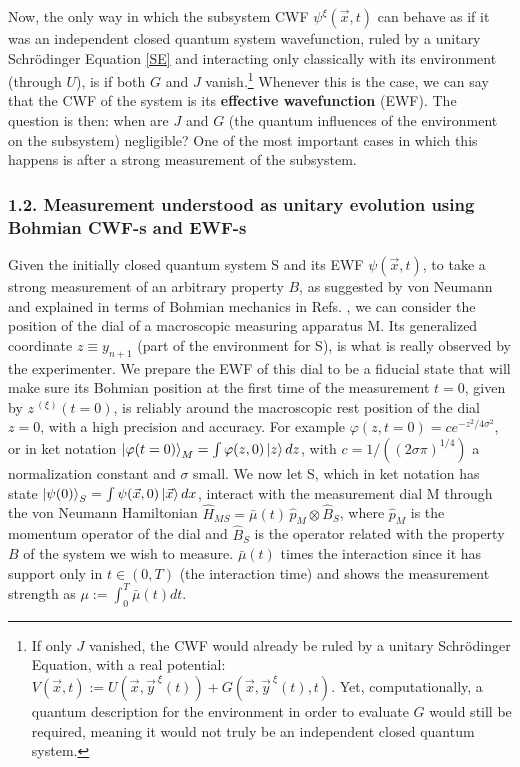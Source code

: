 \documentclass[11pt, a4paper]{article} %
\begin{document}
Now, the only way in which the subsystem CWF $\psi^\xi(\vec{x},t)$ can behave as if it was an independent closed quantum system wavefunction, ruled by a unitary Schrödinger Equation \eqref{SE} and interacting only classically with its environment (through $U$), is if both $G$ and $J$ vanish.\footnote{ If only $J$ vanished, the CWF would already be ruled by a unitary Schrödinger Equation, with a real potential: $V(\vec{x},t):=U(\vec{x},\vec{y}^{\:\xi}(t))+G(\vec{x},\vec{y}^{\:\xi}(t),t)$. Yet, computationally, a quantum description for the environment in order to evaluate $G$ would still be required, meaning it would not truly be an independent closed quantum system. } Whenever this is the case, we can say that the CWF of the system is its {\bf effective wavefunction} (EWF). The question is then: when are $J$ and $G$ (the quantum influences of the environment on the subsystem) negligible? One of the most important cases in which this happens is after a strong measurement of the subsystem. 



\vspace{-0.2cm}

\subsubsection*{1.2. Measurement understood as unitary evolution using Bohmian CWF-s and EWF-s}
\vspace{-0.1cm}
Given the initially closed quantum system S and its EWF $\psi(\vec{x},t)$, to take a strong measurement of an arbitrary property $B$, as suggested by von Neumann \cite{vonNeumann} and explained in terms of Bohmian mechanics in Refs. \cite{Durr, JordiXavier, Holland}, we can consider the position of the dial of a macroscopic measuring apparatus M. Its generalized coordinate $z\equiv y_{n+1}$ (part of the environment for S), is what is really observed by the experimenter. We prepare the EWF of this dial to be a fiducial state that will make sure its Bohmian position at the first time of the measurement $t=0$, given by $z^{\:(\xi)}(t=0)$, is reliably around the macroscopic rest position of the dial $z=0$, with a high precision and accuracy. For example $\varphi(z,t=0)=c e^{-z^2/4\sigma^2}$, or in ket notation $\ket{\varphi(t=0)}_M=\int\varphi(z,0) \ket{z}dz$,  with $c=1/((2\sigma\pi)^{1/4})$ a normalization constant and $\sigma$ small. We now let S, which in ket notation has state $\ket{\psi(0)}_S=\int\psi(\vec{x},0)\ket{\vec{x}}dx$, interact with the measurement dial M through the von Neumann Hamiltonian $\hat{H}_{MS}=\bar{\mu}(t)\,\hat{p}_M\otimes \hat{B}_S$, where $\hat{p}_M$ is the momentum operator of the dial and $\hat{B}_S$ is the operator related with the property $B$ of the system we wish to measure. $\bar{\mu}(t)$ times the interaction since it has support only in $t\in(0,T)$ (the interaction time) and shows the measurement strength as $\mu:=\int_0^T\bar{\mu}(t)dt$. 
\end{document}
